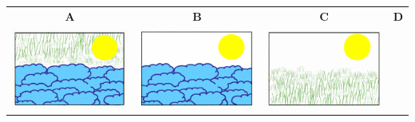 \documentclass[12pt, a4paper]{article}
\begin{document}
\begin{minipage}{\textwidth}
			\begin{table}[H]
				\begin{tabulary}{\linewidth}{|C|C|C|C|}
					\hline
					\textbf{A} & \textbf{B} & \textbf{C} & \textbf{D} \\
					\includegraphics[width=\linewidth]{option1} &
					\includegraphics[width=\linewidth]{option2} &
					\includegraphics[width=\linewidth]{option3} &

\end{tabulary}
\end{table}
\end{minipage}
\end{document}
